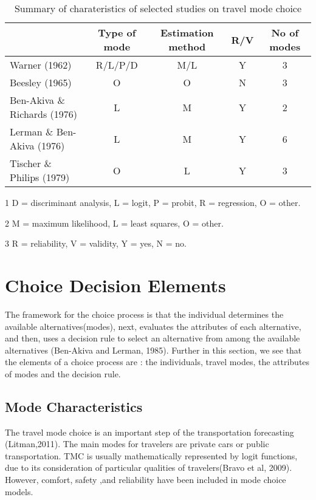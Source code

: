 \begin{table}[h!]
\centering
\begin{threeparttable}
\caption{Summary of charateristics of selected studies on travel mode choice}\label{table:775}
\begin{tabular}{lcccc}
\multicolumn{1}{l}{} \vline  & \multicolumn{1}{c}{Type of mode} & \multicolumn{1}{c}{Estimation method} & \multicolumn{1}{c}{R/V} & \multicolumn{1}{c}{No of modes}  \\ 
\hline
Warner (1962)  & R/L/P/D   & M/L & Y & 3 
\\
Beesley (1965) & O & O  & N & 3
\\
Ben-Akiva \& Richards (1976) & L & M & Y & 2
\\
Lerman \& Ben-Akiva (1976) & L & M & Y & 6
\\
Tischer \& Philips (1979)   & O & L & Y & 3
\end{tabular}
\begin{tablenotes}
        \item[1]D = discriminant analysis, L = logit, P = probit, R = regression, O = other.
        \item[2] M = maximum likelihood, L = least squares, O = other. 
        \item[3] R = reliability, V = validity, Y = yes, N = no.
        
    \end{tablenotes}
    \end{threeparttable}
\end{table}


\section{Choice Decision Elements}
The framework for the choice process is that the individual determines the available alternatives(modes), next, evaluates the attributes of each alternative, and then, uses a decision rule to select an alternative from among the available alternatives (Ben-Akiva and Lerman, 1985). Further in this section, we see that the elements of a choice process are : the individuals, travel modes, the attributes of modes and the decision rule.

\subsection{Mode Characteristics}
The travel mode choice is an important step of the transportation forecasting (Litman,2011). The main modes for travelers are private cars or public transportation. TMC is usually mathematically represented by logit functions, due to its consideration of particular qualities of travelers(Bravo et al, 2009). However, comfort, safety ,and reliability have been included in mode choice models.
